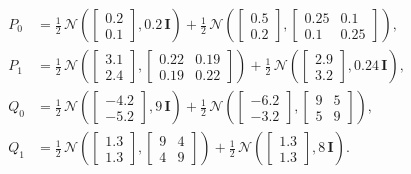 \documentclass[11pt,letterpaper]{article}
\begin{document}
\begin{align}
P_0 &= \tfrac{1}{2}\,\mathcal{N}\!\left(
  \begin{bmatrix}0.2 \\ 0.1\end{bmatrix},
  0.2\,\textbf{I}
\right)
+ \tfrac{1}{2}\,\mathcal{N}\!\left(
  \begin{bmatrix}0.5 \\ 0.2\end{bmatrix},
  \begin{bmatrix}0.25 & 0.1 \\ 0.1 & 0.25\end{bmatrix}
\right), \\[6pt]
P_1 &= \tfrac{1}{2}\,\mathcal{N}\!\left(
  \begin{bmatrix}3.1 \\ 2.4\end{bmatrix},
  \begin{bmatrix}0.22 & 0.19 \\ 0.19 & 0.22\end{bmatrix}
\right)
+ \tfrac{1}{2}\,\mathcal{N}\!\left(
  \begin{bmatrix}2.9 \\ 3.2\end{bmatrix},
  0.24\,\textbf{I}
\right), \\[6pt]
Q_0 &= \tfrac{1}{2}\,\mathcal{N}\!\left(
  \begin{bmatrix}-4.2 \\ -5.2\end{bmatrix},
  9\,\textbf{I}
\right)
+ \tfrac{1}{2}\,\mathcal{N}\!\left(
  \begin{bmatrix}-6.2 \\ -3.2\end{bmatrix},
  \begin{bmatrix}9 & 5 \\ 5 & 9\end{bmatrix}
\right), \\[6pt]
Q_1 &= \tfrac{1}{2}\,\mathcal{N}\!\left(
  \begin{bmatrix}1.3 \\ 1.3\end{bmatrix},
  \begin{bmatrix}9 & 4 \\ 4 & 9\end{bmatrix}
\right)
+ \tfrac{1}{2}\,\mathcal{N}\!\left(
  \begin{bmatrix}1.3 \\ 1.3\end{bmatrix},
  8\,\textbf{I}
\right).
\end{align}
\end{document}
